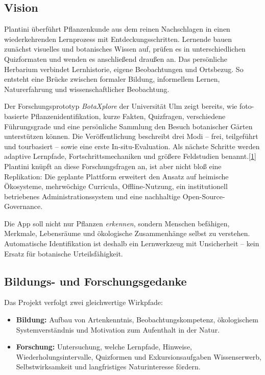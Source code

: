\documentclass[10pt,a4paper,oneside]{article}
\newcommand{\Src}[1]{\hyperlink{src:#1}{\textcolor{Forest}{[#1]}}}
\begin{document}
\subsection{Vision}

Plantini überführt Pflanzenkunde aus dem reinen Nachschlagen in einen wiederkehrenden Lernprozess mit Entdeckungsschritten. Lernende bauen zunächst visuelles und botanisches Wissen auf, prüfen es in unterschiedlichen Quizformaten und wenden es anschließend draußen an. Das persönliche Herbarium verbindet Lernhistorie, eigene Beobachtungen und Ortsbezug. So entsteht eine Brücke zwischen formaler Bildung, informellem Lernen, Naturerfahrung und wissenschaftlicher Beobachtung.

Der Forschungsprototyp \emph{BotaXplore} der Universität Ulm zeigt bereits, wie foto-basierte Pflanzenidentifikation, kurze Fakten, Quizfragen, verschiedene Führungsgrade und eine persönliche Sammlung den Besuch botanischer Gärten unterstützen können. Die Veröffentlichung beschreibt drei Modi -- frei, teilgeführt und tourbasiert -- sowie eine erste In-situ-Evaluation. Als nächste Schritte werden adaptive Lernpfade, Fortschrittsmechaniken und größere Feldstudien benannt.\Src{1} Plantini knüpft an diese Forschungsfragen an, ist aber nicht bloß eine Replikation: Die geplante Plattform erweitert den Ansatz auf heimische Ökosysteme, mehrwöchige Curricula, Offline-Nutzung, ein institutionell betriebenes Administrationssystem und eine nachhaltige Open-Source-Governance.

\begin{decisionbox}[title={\textbf{Leitidee}}]
Die App soll nicht nur Pflanzen \emph{erkennen}, sondern Menschen befähigen, Merkmale, Lebensräume und ökologische Zusammenhänge selbst zu verstehen. Automatische Identifikation ist deshalb ein Lernwerkzeug mit Unsicherheit -- kein Ersatz für botanische Urteilsfähigkeit.
\end{decisionbox}

\subsection{Bildungs- und Forschungsgedanke}

Das Projekt verfolgt zwei gleichwertige Wirkpfade:

\begin{itemize}
  \item \textbf{Bildung:} Aufbau von Artenkenntnis, Beobachtungskompetenz, ökologischem Systemverständnis und Motivation zum Aufenthalt in der Natur.
  \item \textbf{Forschung:} Untersuchung, welche Lernpfade, Hinweise, Wiederholungsintervalle, Quizformen und Exkursionsaufgaben Wissenserwerb, Selbstwirksamkeit und langfristiges Naturinteresse fördern.
\end{itemize}
\end{document}
